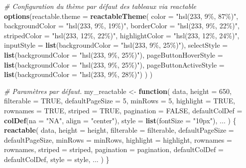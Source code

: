 \documentclass[
  french,
]{book}
\newenvironment{Shaded}{\begin{snugshade}}{\end{snugshade}}
\newcommand{\CommentTok}[1]{\textcolor[rgb]{0.56,0.35,0.01}{\textit{#1}}}
\newcommand{\ControlFlowTok}[1]{\textcolor[rgb]{0.13,0.29,0.53}{\textbf{#1}}}
\newcommand{\DataTypeTok}[1]{\textcolor[rgb]{0.13,0.29,0.53}{#1}}
\newcommand{\DecValTok}[1]{\textcolor[rgb]{0.00,0.00,0.81}{#1}}
\newcommand{\KeywordTok}[1]{\textcolor[rgb]{0.13,0.29,0.53}{\textbf{#1}}}
\newcommand{\NormalTok}[1]{#1}
\newcommand{\OtherTok}[1]{\textcolor[rgb]{0.56,0.35,0.01}{#1}}
\newcommand{\StringTok}[1]{\textcolor[rgb]{0.31,0.60,0.02}{#1}}
\begin{document}
\begin{Shaded}
\begin{Highlighting}[]
\CommentTok{\# Configuration du thème par défaut des tableaux via \textquotesingle{}reactable\textquotesingle{}}
\KeywordTok{options}\NormalTok{(}\DataTypeTok{reactable.theme =} \KeywordTok{reactableTheme}\NormalTok{(}
  \DataTypeTok{color =} \StringTok{"hsl(233, 9\%, 87\%)"}\NormalTok{,}
  \DataTypeTok{backgroundColor =} \StringTok{"hsl(233, 9\%, 19\%)"}\NormalTok{, }
  \DataTypeTok{borderColor =} \StringTok{"hsl(233, 9\%, 22\%)"}\NormalTok{, }
  \DataTypeTok{stripedColor =} \StringTok{"hsl(233, 12\%, 22\%)"}\NormalTok{, }
  \DataTypeTok{highlightColor =} \StringTok{"hsl(233, 12\%, 24\%)"}\NormalTok{,}
  \DataTypeTok{inputStyle =} \KeywordTok{list}\NormalTok{(}\DataTypeTok{backgroundColor =} \StringTok{"hsl(233, 9\%, 25\%)"}\NormalTok{), }
  \DataTypeTok{selectStyle =} \KeywordTok{list}\NormalTok{(}\DataTypeTok{backgroundColor =} \StringTok{"hsl(233, 9\%, 25\%)"}\NormalTok{), }
  \DataTypeTok{pageButtonHoverStyle =} \KeywordTok{list}\NormalTok{(}\DataTypeTok{backgroundColor =} \StringTok{"hsl(233, 9\%, 25\%)"}\NormalTok{), }
  \DataTypeTok{pageButtonActiveStyle =} \KeywordTok{list}\NormalTok{(}\DataTypeTok{backgroundColor =} \StringTok{"hsl(233, 9\%, 28\%)"}\NormalTok{)}
\NormalTok{  )}
\NormalTok{)}

\CommentTok{\# Paramètres par défaut.}
\NormalTok{my\_reactable \textless{}{-}}\StringTok{ }\ControlFlowTok{function}\NormalTok{(}
\NormalTok{  data,}
  \DataTypeTok{height =} \DecValTok{650}\NormalTok{,}
  \DataTypeTok{filterable =} \OtherTok{TRUE}\NormalTok{,}
  \DataTypeTok{defaultPageSize =} \DecValTok{5}\NormalTok{, }
  \DataTypeTok{minRows =} \DecValTok{5}\NormalTok{,}
  \DataTypeTok{highlight =} \OtherTok{TRUE}\NormalTok{,}
  \DataTypeTok{rownames =} \OtherTok{TRUE}\NormalTok{,}
  \DataTypeTok{striped =} \OtherTok{TRUE}\NormalTok{,}
  \DataTypeTok{pagination =} \OtherTok{FALSE}\NormalTok{,}
  \DataTypeTok{defaultColDef =} \KeywordTok{colDef}\NormalTok{(}\DataTypeTok{na =} \StringTok{"NA"}\NormalTok{, }\DataTypeTok{align =} \StringTok{"center"}\NormalTok{),}
  \DataTypeTok{style =} \KeywordTok{list}\NormalTok{(}\DataTypeTok{fontSize =} \StringTok{"10px"}\NormalTok{),}
\NormalTok{  ...}
\NormalTok{) \{}
  \KeywordTok{reactable}\NormalTok{(}
\NormalTok{    data,}
    \DataTypeTok{height =}\NormalTok{ height,}
    \DataTypeTok{filterable =}\NormalTok{ filterable,}
    \DataTypeTok{defaultPageSize =}\NormalTok{ defaultPageSize, }
    \DataTypeTok{minRows =}\NormalTok{ minRows,}
    \DataTypeTok{highlight =}\NormalTok{ highlight,}
    \DataTypeTok{rownames =}\NormalTok{ rownames,}
    \DataTypeTok{striped =}\NormalTok{ striped,}
    \DataTypeTok{pagination =}\NormalTok{ pagination,}
    \DataTypeTok{defaultColDef =}\NormalTok{ defaultColDef,}
    \DataTypeTok{style =}\NormalTok{ style,}
\NormalTok{    ...}
\NormalTok{  )}
\NormalTok{\}}
\end{Highlighting}
\end{Shaded}
\end{document}
